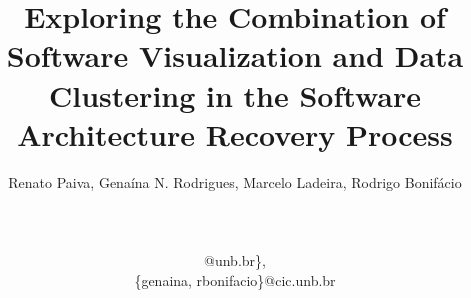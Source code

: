 \documentclass{sig-alternate-05-2015}
\begin{document}






%

\title{Exploring the Combination of Software Visualization and Data Clustering in the Software Architecture Recovery Process}


%
\author{
%
%
\alignauthor
Renato Paiva, Genaína N. Rodrigues, Marcelo Ladeira,  Rodrigo Bonif\'{a}cio\\
       \\
       \\
       \\
       @unb.br\},\\
       \{genaina, rbonifacio\}@cic.unb.br}
\end{document}
